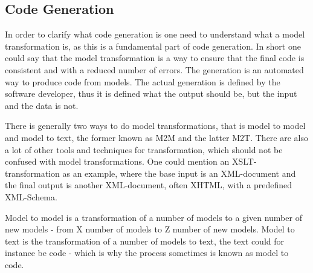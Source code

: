 \subsection{Code Generation}
\label{background-codegeneration}

In order to clarify what code generation is one need to understand what a model
transformation is, as this is a fundamental part of code generation. In short
one could say that the model transformation is a way to ensure that the final
code is consistent and with a reduced number of errors. The generation is an
automated way to produce code from models. The actual generation is defined by
the software developer, thus it is defined what the output should be, but the
input and the data is not.

There is generally two ways to do model transformations, that is model to model
and model to text, the former known as M2M and the latter M2T. There are also a
lot of other tools and techniques for transformation, which should not be
confused with model transformations. One could mention an XSLT-transformation as
an example, where the base input is an XML-document and the final output is
another XML-document, often XHTML, with a predefined XML-Schema.

Model to model is a transformation of a number of models to a given number of
new models - from X number of models to Z number of new models. Model to text is
the transformation of a number of models to text, the text could for instance be
code - which is why the process sometimes is known as model to code.
